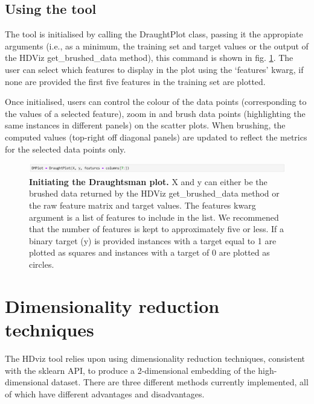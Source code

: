 \documentclass[11pt]{article} %
\begin{document}
\subsection{Using the tool}

The tool is initialised by calling the DraughtPlot class, passing it the appropiate arguments (i.e., as a minimum, the training set and target values or the output of the HDViz get\_brushed\_data method), this command is shown in fig. \ref{fig:DP_init}. The user can select which features to display in the plot using the `features' kwarg, if none are provided the first five features in the training set are plotted. 

Once initialised, users can control the colour of the data points (corresponding to the values of a selected feature), zoom in and brush data points (highlighting the same instances in different panels) on the scatter plots. When brushing, the computed values (top-right off diagonal panels) are updated to reflect the metrics for the selected data points only.

\begin{figure}
\centering
\includegraphics[width=5.75in]{images/DP_start.png}
\caption{\textbf{Initiating the Draughtsman plot.} X and y can either be the brushed data returned by the HDViz get\_brushed\_data method or the raw feature matrix and target values. The features kwarg argument is a list of features to include in the list. We recommened that the number of features is kept to approximately five or less. If a binary target (y) is provided instances with a target equal to 1 are plotted as squares and instances with a target of 0 are plotted as circles.}
\label{fig:DP_init}
\end{figure}


\clearpage

\appendix

\section{Dimensionality reduction techniques}

The HDviz tool relies upon using dimensionality reduction techniques, consistent with the sklearn API, to produce a 2-dimensional embedding of the high-dimensional dataset. There are three different methods currently implemented, all of which have different advantages and disadvantages.
\end{document}
